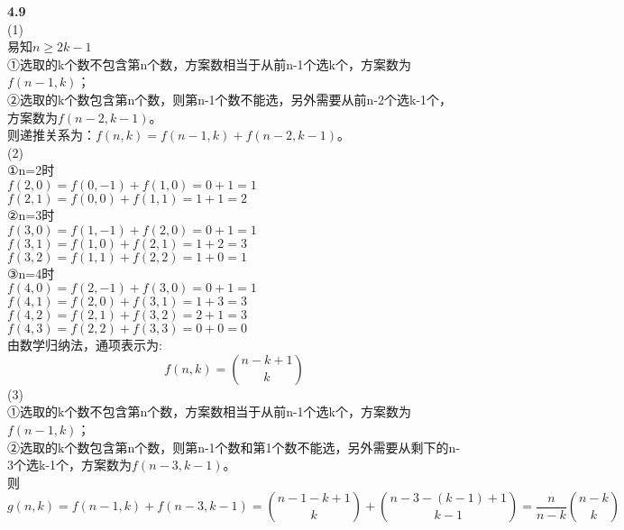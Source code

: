 \documentclass[a4paper,12pt]{article}
\begin{document}
	\noindent
	\textbf{4.9}\\
	(1)\\
	易知$n\geq2k-1$\\
	①选取的k个数不包含第n个数，方案数相当于从前n-1个选k个，方案数为$f(n-1,k)$；\\
	②选取的k个数包含第n个数，则第n-1个数不能选，另外需要从前n-2个选k-1个，方案数为$f(n-2,k-1)$。\\
	则递推关系为：$f(n,k)=f(n-1,k)+f(n-2,k-1)$。\\
	(2)\\
	①n=2时\\
	$f(2,0)=f(0,-1)+f(1,0)=0+1=1$\\
	$f(2,1)=f(0,0)+f(1,1)=1+1=2$\\
	②n=3时\\
	$f(3,0)=f(1,-1)+f(2,0)=0+1=1$\\
	$f(3,1)=f(1,0)+f(2,1)=1+2=3$\\
	$f(3,2)=f(1,1)+f(2,2)=1+0=1$\\
	③n=4时\\
	$f(4,0)=f(2,-1)+f(3,0)=0+1=1$\\
	$f(4,1)=f(2,0)+f(3,1)=1+3=3$\\
	$f(4,2)=f(2,1)+f(3,2)=2+1=3$\\
	$f(4,3)=f(2,2)+f(3,3)=0+0=0$\\
	由数学归纳法，通项表示为:\[
		f(n,k)=\binom{n-k+1}{k}
	\]
	(3)\\
	①选取的k个数不包含第n个数，方案数相当于从前n-1个选k个，方案数为$f(n-1,k)$；\\
	②选取的k个数包含第n个数，则第n-1个数和第1个数不能选，另外需要从剩下的n-3个选k-1个，方案数为$f(n-3,k-1)$。\\
	则\[
		g(n,k)=f(n-1,k)+f(n-3,k-1)=\binom{n-1-k+1}{k}+\binom{n-3-(k-1)+1}{k-1}=\frac{n}{n-k}\binom{n-k}{k}
	\]
	\\
	
\end{document}
